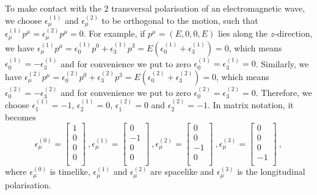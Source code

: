     To make contact with the $2$ transversal polarisation of an electromagnetic wave, we choose $\epsilon_\mu^{(1)}$ and $\epsilon_\mu^{(2)}$ to be orthogonal to the motion, such that $\epsilon_\mu^{(1)} p^\mu = \epsilon_\mu^{(2)} p^\mu = 0$. For example, if $p^\mu = (E, 0, 0, E)$ lies along the $z$-direction, we have $\epsilon_\mu^{(1)} p^\mu = \epsilon_0^{(1)} p^0 + \epsilon_3^{(1)} p^3 = E (\epsilon_0^{(1)} + \epsilon_3^{(1)}) = 0$, which means $\epsilon_0^{(1)} = -\epsilon_3^{(1)}$ and for convenience we put to zero $\epsilon_0^{(1)} = \epsilon_3^{(1)} = 0$. Similarly, we have $\epsilon_\mu^{(2)} p^\mu = \epsilon_0^{(2)} p^0 + \epsilon_3^{(2)} p^3 = E (\epsilon_0^{(2)} + \epsilon_3^{(2)}) = 0$, which means $\epsilon_0^{(2)} = -\epsilon_3^{(2)}$ and for convenience we put to zero $\epsilon_0^{(2)} = \epsilon_3^{(2)} = 0$. Therefore, we choose $\epsilon_1^{(1)} = -1$, $\epsilon_2^{(1)} = 0$, $\epsilon_1^{(2)} = 0$ and $\epsilon_2^{(2)} = -1$. In matrix notation, it becomes
    \begin{equation}\label{pol}
        \epsilon^{(0)}_\mu = \begin{bmatrix}
            1 \\ 0 \\ 0 \\ 0 \\
        \end{bmatrix} ~,  \epsilon^{(1)}_\mu = \begin{bmatrix}
            0 \\ - 1 \\ 0 \\ 0 \\
        \end{bmatrix} ~, \epsilon^{(2)}_\mu = \begin{bmatrix}
            0 \\ 0 \\ - 1 \\ 0 \\
        \end{bmatrix} ~, \epsilon^{(3)}_\mu = \begin{bmatrix}
            0 \\ 0 \\ 0 \\ - 1 \\
        \end{bmatrix} ~,
    \end{equation}
    where $\epsilon^{(0)}_\mu$ is timelike, $\epsilon^{(1)}_\mu$ and $\epsilon^{(2)}_\mu$ are spacelike and $\epsilon^{(3)}_\mu$ is the longitudinal polarisation.

